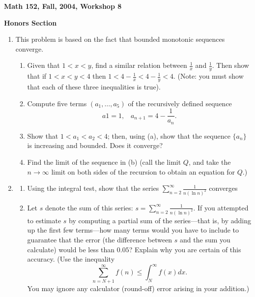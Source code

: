 \documentclass[12pt]{article}
\begin{document}
\begin{center}

{\large \bf Math 152, Fall, 2004, Workshop 8\par}
\vspace{.5cm}
{{\bf Honors Section} 
\par}
\end{center}

\begin{enumerate}

\item This problem is based on the fact that bounded monotonic 
sequences converge. 

\begin{enumerate}

\item Given that $1 < x < y$, find a similar relation between
${\displaystyle \frac{1}{x}}$ and ${\displaystyle \frac{1}{y}}$. 
Then show that if $1 < x < y < 4$
then ${\displaystyle 1 < 4-\frac{1}{x} 
< 4-\frac{1}{y}
< 4}$. (Note: you must show that each of these three inequalities is true). 

\item Compute five terms $(a_{1}, \dots, a_{5})$ of the recursively 
defined sequence 
$$a 1 = 1, \;\;\; a_{n+1}=4-\frac{1}{a_{n}}.$$

\item Show that $1 < a_{1} < a_{2} < 4$; then, using (a), show that the 
sequence $\{a_{n}\}$ is increasing and 
bounded. Does it converge? 

\item Find the limit of the sequence in (b) (call the limit 
$Q$, and take the $n\to \infty$ limit on both sides 
of the recursion to obtain an equation for $Q$.) 

\end{enumerate}

\item \begin{enumerate}
\item Using the integral test, show that the series 
${\displaystyle \sum_{n=2}^{\infty}\frac{1}{n(\ln n)^{2}}}$ converges

\item Let $s$ denote the sum of this series: $s = 
{\displaystyle \sum_{n=2}^{\infty}\frac{1}{n(\ln n)^{2}}}$.
If you attempted to estimate $s$ 
by computing a partial sum of the series---that is, 
by adding up the first few terms---how 
many terms would you have to include to guarantee that the error 
(the difference between 
$s$ and the sum you calculate) 
would be less than $0.05$? Explain why you are certain of this 
accuracy. (Use the inequality 
$$\sum_{n=N+1}^{\infty}f(n)\le \int_{N}^{\infty}f(x)dx.$$
You may ignore any calculator (round-off) error arising in your addition.)


\end{enumerate}
\end{enumerate}
\end{document}
